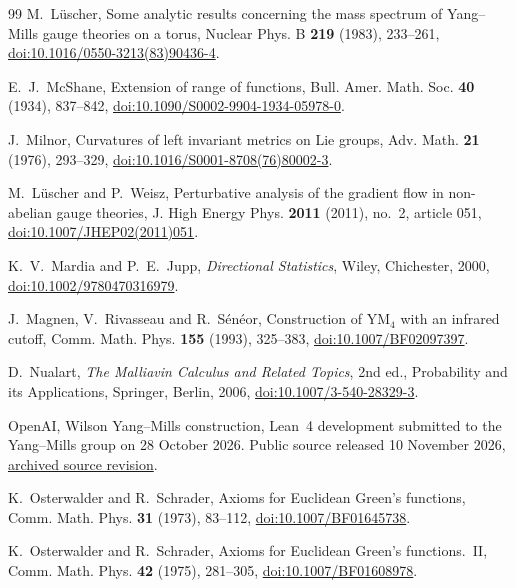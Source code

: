 \begin{thebibliography}{99}
M.~L\"uscher, Some analytic results concerning the mass spectrum of Yang--Mills
gauge theories on a torus, Nuclear Phys. B \textbf{219} (1983), 233--261,
\href{https://doi.org/10.1016/0550-3213(83)90436-4}{doi:10.1016/0550-3213(83)90436-4}.

E.~J.~McShane, Extension of range of functions, Bull. Amer. Math. Soc. \textbf{40} (1934), 837--842, \href{https://doi.org/10.1090/S0002-9904-1934-05978-0}{doi:10.1090/S0002-9904-1934-05978-0}.

J.~Milnor, Curvatures of left invariant metrics on Lie groups, Adv.
Math. \textbf{21} (1976), 293--329,
\href{https://doi.org/10.1016/S0001-8708(76)80002-3}{doi:10.1016/S0001-8708(76)80002-3}.

M.~L\"uscher and P.~Weisz, Perturbative analysis of the gradient flow in
non-abelian gauge theories, J. High Energy Phys. \textbf{2011} (2011),
no.~2, article 051,
\href{https://doi.org/10.1007/JHEP02(2011)051}{doi:10.1007/JHEP02(2011)051}.

K.~V.~Mardia and P.~E.~Jupp, \emph{Directional Statistics}, Wiley, Chichester, 2000, \href{https://doi.org/10.1002/9780470316979}{doi:10.1002/9780470316979}.

J.~Magnen, V.~Rivasseau and R.~S\'en\'eor, Construction of YM$_4$ with an infrared cutoff, Comm. Math. Phys. \textbf{155} (1993), 325--383, \href{https://doi.org/10.1007/BF02097397}{doi:10.1007/BF02097397}.

D.~Nualart, \emph{The Malliavin Calculus and Related Topics}, 2nd ed., Probability and its Applications, Springer, Berlin, 2006, \href{https://doi.org/10.1007/3-540-28329-3}{doi:10.1007/3-540-28329-3}.

OpenAI, Wilson Yang--Mills construction, Lean~4 development submitted to the
Yang--Mills group on 28 October 2026. Public source released 10 November 2026,
\href{https://github.com/yang-mills-group/OpenAI-YM-20261028/tree/3456e5e75cf8d4cd558955a5c7638fba2d68f464}{archived source revision}.

K.~Osterwalder and R.~Schrader, Axioms for Euclidean Green's functions,
Comm. Math. Phys. \textbf{31} (1973), 83--112,
\href{https://doi.org/10.1007/BF01645738}{doi:10.1007/BF01645738}.

K.~Osterwalder and R.~Schrader, Axioms for Euclidean Green's functions.~II,
Comm. Math. Phys. \textbf{42} (1975), 281--305,
\href{https://doi.org/10.1007/BF01608978}{doi:10.1007/BF01608978}.


\end{thebibliography}
